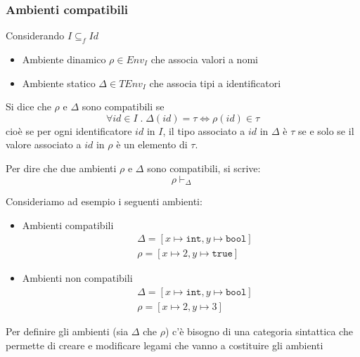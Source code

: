 \documentclass[a4paper]{article}
\begin{document}
\subsubsection{Ambienti compatibili}
\begin{definition}
  Considerando \( I \subseteq_f Id \) 
  \begin{itemize}
    \item Ambiente dinamico \( \rho \in Env_I \) che associa valori a nomi
    \item Ambiente statico \( \Delta \in TEnv_I \) che associa tipi a identificatori
  \end{itemize}
  Si dice che \( \rho  \) e \( \Delta \) sono compatibili se
  \[
    \forall id \in I \;.\; \Delta(id) = \tau \iff \rho(id) \in \tau
  \] 
  cioè se per ogni identificatore \( id \) in \( I \), il tipo associato a \( id \) in
  \( \Delta \) è \( \tau \) se e solo se il valore associato a \( id \) in \( \rho \) è
  un elemento di \( \tau \).

  Per dire che due ambienti \( \rho  \) e \( \Delta \) sono compatibili, si scrive:
  \[
    \rho \vdash_{\Delta}
  \] 
\end{definition}

\begin{example}
  Consideriamo ad esempio i seguenti ambienti:
  \begin{itemize}
    \item Ambienti compatibili
      \[
        \begin{aligned}
        &\Delta = \left[ x \mapsto \texttt{int}, y \mapsto \texttt{bool} \right] \\
        &\rho = \left[ x \mapsto 2, y \mapsto \texttt{true} \right]
        \end{aligned}
      \] 

    \item Ambienti non compatibili
      \[
        \begin{aligned}
        &\Delta = \left[ x \mapsto \texttt{int}, y \mapsto \texttt{bool} \right] \\
        &\rho = \left[ x \mapsto 2, y \mapsto 3 \right]
        \end{aligned}
      \] 
  \end{itemize}
\end{example}

\noindent
Per definire gli ambienti (sia \( \Delta \) che \( \rho  \)) c'è bisogno di una
categoria sintattica che permette di creare e modificare legami che vanno a costituire
gli ambienti
\end{document}
